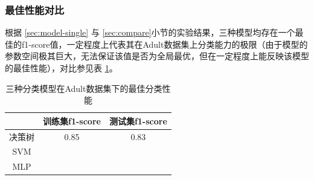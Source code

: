\documentclass[12pt,a4paper]{article}
\theoremstyle{definition}
\begin{document}
{\subsubsection{最佳性能对比}

根据 \ref{sec:model-single} 与 \ref{sec:compare}小节的实验结果，三种模型均存在一个最佳的f1-score值，一定程度上代表其在Adult数据集上分类能力的极限（由于模型的参数空间极其巨大，无法保证该值是否为全局最优，但在一定程度上能反映该模型的最佳性能），对比参见表 \ref{tab:final_compare}。

\begin{table}[H]
	\renewcommand\arraystretch{1.35}
	\caption{三种分类模型在Adult数据集下的最佳分类性能}
	\label{tab:final_compare}
	\centering
	
	\begin{tabular}{c|c|c}
		\centering
		 & 训练集f1-score & 测试集f1-score \\
		\hline
		\hline
		
		决策树 & 0.85 & 0.83 \\
		SVM & & \\
		MLP & & \\	

	\end{tabular}
\end{table}


}
\end{document}
